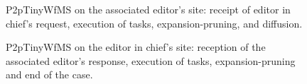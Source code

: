 \begin{figure}[ht!]
	\noindent
	\caption{P2pTinyWfMS on the associated editor's site: receipt of editor in chief's request, execution of tasks, expansion-pruning, and diffusion.}
	\label{chap3:sec:p2ptinywfms-3}
\end{figure}

\begin{figure}[ht!]
	\noindent
	\caption{P2pTinyWfMS on the editor in chief's site: reception of the associated editor's response, execution of tasks, expansion-pruning and end of the case.}
	\label{chap3:sec:p2ptinywfms-6}
\end{figure}
